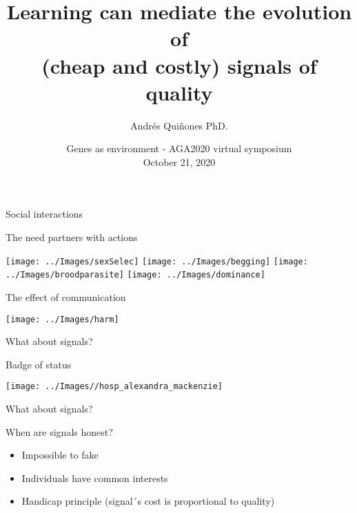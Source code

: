 \documentclass[
  ignorenonframetext,
]{beamer}
\title{Learning can mediate the evolution of\\
(cheap and costly) signals of quality}
\author{Andrés Quiñones PhD.}
\date{Genes as environment - AGA2020 virtual symposium\\
October 21, 2020}
\providecommand{\tightlist}{%
  \setlength{\itemsep}{0pt}\setlength{\parskip}{0pt}}
\begin{document}
\frame{\titlepage}

\begin{frame}{Social interactions}
\protect\hypertarget{social-interactions}{}

\begin{block}{The need partners with actions}

\begin{center}\texttt{[image: ../Images/sexSelec]} \texttt{[image: ../Images/begging]} \texttt{[image: ../Images/broodparasite]} \texttt{[image: ../Images/dominance]} \end{center}

\end{block}

\end{frame}

\begin{frame}{The effect of communication}
\protect\hypertarget{the-effect-of-communication}{}

\begin{center}\texttt{[image: ../Images/harm]} \end{center}

\end{frame}

\begin{frame}{What about signals?}
\protect\hypertarget{what-about-signals}{}

\begin{block}{Badge of status}

\begin{center}\texttt{[image: ../Images//hosp\_alexandra\_mackenzie]} \end{center}

\end{block}

\end{frame}

\begin{frame}{What about signals?}
\protect\hypertarget{what-about-signals-1}{}

\begin{block}{When are signals honest?}

\begin{itemize}
\tightlist
\item
  Impossible to fake
\item
  Individuals have common interests
\item
  Handicap principle (signal´s cost is proportional to quality)
\end{itemize}

\end{block}

\end{frame}
\end{document}
